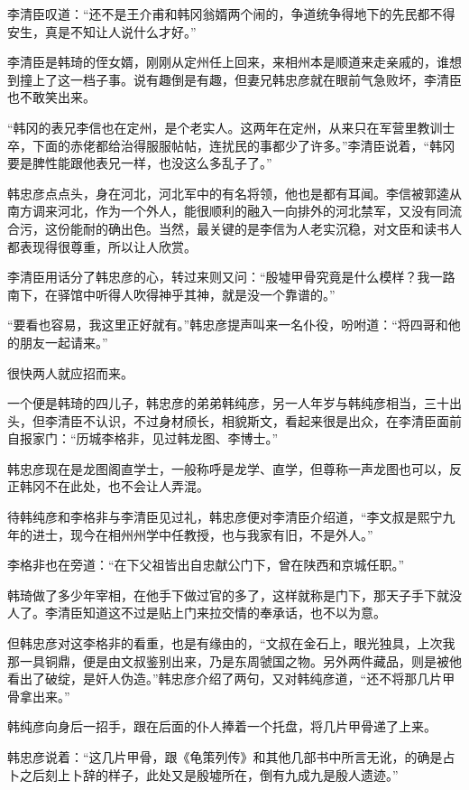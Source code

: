 李清臣叹道：“还不是王介甫和韩冈翁婿两个闹的，争道统争得地下的先民都不得安生，真是不知让人说什么才好。”

李清臣是韩琦的侄女婿，刚刚从定州任上回来，来相州本是顺道来走亲戚的，谁想到撞上了这一档子事。说有趣倒是有趣，但妻兄韩忠彦就在眼前气急败坏，李清臣也不敢笑出来。

“韩冈的表兄李信也在定州，是个老实人。这两年在定州，从来只在军营里教训士卒，下面的赤佬都给治得服服帖帖，连扰民的事都少了许多。”李清臣说着，“韩冈要是脾性能跟他表兄一样，也没这么多乱子了。”

韩忠彦点点头，身在河北，河北军中的有名将领，他也是都有耳闻。李信被郭逵从南方调来河北，作为一个外人，能很顺利的融入一向排外的河北禁军，又没有同流合污，这份能耐的确出色。当然，最关键的是李信为人老实沉稳，对文臣和读书人都表现得很尊重，所以让人欣赏。

李清臣用话分了韩忠彦的心，转过来则又问：“殷墟甲骨究竟是什么模样？我一路南下，在驿馆中听得人吹得神乎其神，就是没一个靠谱的。”

“要看也容易，我这里正好就有。”韩忠彦提声叫来一名仆役，吩咐道：“将四哥和他的朋友一起请来。”

很快两人就应招而来。

一个便是韩琦的四儿子，韩忠彦的弟弟韩纯彦，另一人年岁与韩纯彦相当，三十出头，但李清臣不认识，不过身材颀长，相貌斯文，看起来很是出众，在李清臣面前自报家门：“历城李格非，见过韩龙图、李博士。”

韩忠彦现在是龙图阁直学士，一般称呼是龙学、直学，但尊称一声龙图也可以，反正韩冈不在此处，也不会让人弄混。

待韩纯彦和李格非与李清臣见过礼，韩忠彦便对李清臣介绍道，“李文叔是熙宁九年的进士，现今在相州州学中任教授，也与我家有旧，不是外人。”

李格非也在旁道：“在下父祖皆出自忠献公门下，曾在陕西和京城任职。”

韩琦做了多少年宰相，在他手下做过官的多了，这样就称是门下，那天子手下就没人了。李清臣知道这不过是贴上门来拉交情的奉承话，也不以为意。

但韩忠彦对这李格非的看重，也是有缘由的，“文叔在金石上，眼光独具，上次我那一具铜鼎，便是由文叔鉴别出来，乃是东周虢国之物。另外两件藏品，则是被他看出了破绽，是奸人伪造。”韩忠彦介绍了两句，又对韩纯彦道，“还不将那几片甲骨拿出来。”

韩纯彦向身后一招手，跟在后面的仆人捧着一个托盘，将几片甲骨递了上来。

韩忠彦说着：“这几片甲骨，跟《龟策列传》和其他几部书中所言无讹，的确是占卜之后刻上卜辞的样子，此处又是殷墟所在，倒有九成九是殷人遗迹。”

